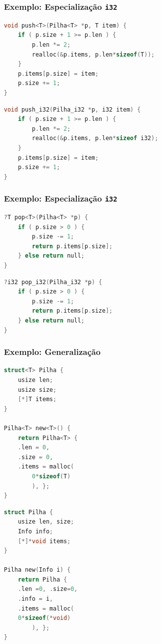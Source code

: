 \documentclass{beamer}
\newcommand{\inlcode}[1]{\texttt{#1}}
\begin{document}
\begin{frame}[fragile]
    \frametitle{Exemplo: Especialização \inlcode{i32}}
    \begin{lstlisting}[language=C]
void push<T>(Pilha<T> *p, T item) {
    if ( p.size + 1 >= p.len ) {
        p.len *= 2;
        realloc(&p.items, p.len*sizeof(T));
    }
    p.items[p.size] = item;
    p.size += 1;
}
    \end{lstlisting}
    \vfill
    \begin{lstlisting}[language=C]
void push_i32(Pilha_i32 *p, i32 item) {
    if ( p.size + 1 >= p.len ) {
        p.len *= 2;
        realloc(&p.items, p.len*sizeof i32);
    }
    p.items[p.size] = item;
    p.size += 1;
}
    \end{lstlisting}
\end{frame}

\begin{frame}[fragile]
    \frametitle{Exemplo: Especialização \inlcode{i32}}
    \begin{lstlisting}[language=C]
?T pop<T>(Pilha<T> *p) {
    if ( p.size > 0 ) {
        p.size -= 1;
        return p.items[p.size];
    } else return null;
}
    \end{lstlisting}
    \vfill
    \begin{lstlisting}[language=C]
?i32 pop_i32(Pilha_i32 *p) {
    if ( p.size > 0 ) {
        p.size -= 1;
        return p.items[p.size];
    } else return null;
}
    \end{lstlisting}
\end{frame}

\begin{frame}[fragile]
    \frametitle{Exemplo: Generalização}
    \begin{multicols}{2}
        \begin{lstlisting}[language=C]
struct<T> Pilha {
    usize len;
    usize size;
    [*]T items;
}

Pilha<T> new<T>() {
    return Pilha<T> {
    .len = 0,
    .size = 0,
    .items = malloc(
        0*sizeof(T)
        ), };
}
        \end{lstlisting}
        \columnbreak
        \begin{lstlisting}[language=C]
struct Pilha {
    usize len, size;
    Info info;
    [*]*void items;
}

Pilha new(Info i) {
    return Pilha {
    .len =0, .size=0,
    .info = i,
    .items = malloc(
    0*sizeof(*void)
        ), };
}
        \end{lstlisting}
    \end{multicols}
\end{frame}
\end{document}
